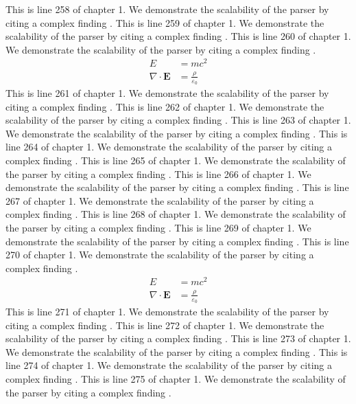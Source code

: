 This is line 258 of chapter 1. We demonstrate the scalability of the parser by citing a complex finding \cite{ref1_258}.
This is line 259 of chapter 1. We demonstrate the scalability of the parser by citing a complex finding \cite{ref1_259}.
This is line 260 of chapter 1. We demonstrate the scalability of the parser by citing a complex finding \cite{ref1_260}.
\begin{align*}
  E &= mc^2 \\
  \nabla \cdot \mathbf{E} &= \frac{\rho}{\varepsilon_0}
\end{align*}
This is line 261 of chapter 1. We demonstrate the scalability of the parser by citing a complex finding \cite{ref1_261}.
This is line 262 of chapter 1. We demonstrate the scalability of the parser by citing a complex finding \cite{ref1_262}.
This is line 263 of chapter 1. We demonstrate the scalability of the parser by citing a complex finding \cite{ref1_263}.
This is line 264 of chapter 1. We demonstrate the scalability of the parser by citing a complex finding \cite{ref1_264}.
This is line 265 of chapter 1. We demonstrate the scalability of the parser by citing a complex finding \cite{ref1_265}.
This is line 266 of chapter 1. We demonstrate the scalability of the parser by citing a complex finding \cite{ref1_266}.
This is line 267 of chapter 1. We demonstrate the scalability of the parser by citing a complex finding \cite{ref1_267}.
This is line 268 of chapter 1. We demonstrate the scalability of the parser by citing a complex finding \cite{ref1_268}.
This is line 269 of chapter 1. We demonstrate the scalability of the parser by citing a complex finding \cite{ref1_269}.
This is line 270 of chapter 1. We demonstrate the scalability of the parser by citing a complex finding \cite{ref1_270}.
\begin{align*}
  E &= mc^2 \\
  \nabla \cdot \mathbf{E} &= \frac{\rho}{\varepsilon_0}
\end{align*}
This is line 271 of chapter 1. We demonstrate the scalability of the parser by citing a complex finding \cite{ref1_271}.
This is line 272 of chapter 1. We demonstrate the scalability of the parser by citing a complex finding \cite{ref1_272}.
This is line 273 of chapter 1. We demonstrate the scalability of the parser by citing a complex finding \cite{ref1_273}.
This is line 274 of chapter 1. We demonstrate the scalability of the parser by citing a complex finding \cite{ref1_274}.
This is line 275 of chapter 1. We demonstrate the scalability of the parser by citing a complex finding \cite{ref1_275}.
